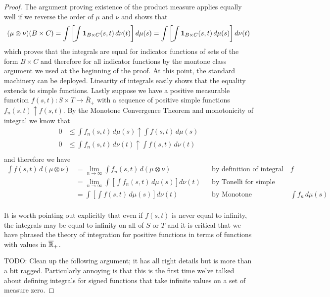 \begin{proof}
The argument proving existence of the product measure applies equally well if we reverse the order
of $\mu$ and $\nu$ and shows that 
\begin{align*}
(\mu \otimes \nu)(B \times C) = \int \left [ \int \textbf{1}_{B
    \times C}(s,t) \, d
\nu(t) \right ] d \mu(s) = \int \left [ \int \textbf{1}_{B \times C}(s,t)
\, d \mu(s) \right ] d \nu(t)
\end{align*}
which proves that the integrals are equal for indicator functions of
sets of the form $B \times C$ and therefore for all indicator
functions by the montone class argument we used at the beginning of
the proof.  At this point, the
standard machinery can be deployed.  Linearity of integrals easily
shows that the equality extends to simple functions.  Lastly suppose
we have a positive measurable function $f(s,t) : S \times T \to
\overline{R}_+$ with a sequence of positive simple functions
$f_n(s,t) \uparrow f(s,t)$.  By the Monotone Convergence Theorem and
monotonicity of integral we know that 
\begin{align*}
0 &\leq \int f_n(s,t) \, d\mu(s) \uparrow \int f(s,t) \, d\mu(s) \\
0 &\leq \int f_n(s,t) \, d\nu(t) \uparrow \int f(s,t) \, d\nu(t) \\
\end{align*}
and therefore we have
\begin{align*}
\int f(s,t) \,  d (\mu \otimes \nu) 
&= \lim_{n \to \infty} \int
 f_n(s,t) \,  d (\mu \otimes \nu)  & & \text{by definition of integral
   of $f$}\\
&= \lim_{n \to \infty} \int \left [
\int f_n(s,t) \,  d \mu(s) \right ] d\nu(t) & &\text{by Tonelli
for simple functions}\\
&= \int \left [
\int f(s,t) \,  d \mu(s) \right ] d\nu(t) & &\text{by Monotone Convergence
   on $\int f_n \, d \mu(s)$}\\
\end{align*}

It is worth pointing out explicitly that even if $f(s,t)$ is never
equal to infinity, the integrals may be equal to infinity on all of
$S$ or $T$ and it is critical that we have phrased the theory of
integration for positive functions in terms of functions with values
in $\overline{\mathbb{R}}_+$.

TODO: Clean up the following argument; it has all right details but is
more than a bit ragged.  Particularly annoying is that this is the
first time we've talked about defining integrals for signed functions
that take infinite values on a set of measure zero.


\end{proof}
